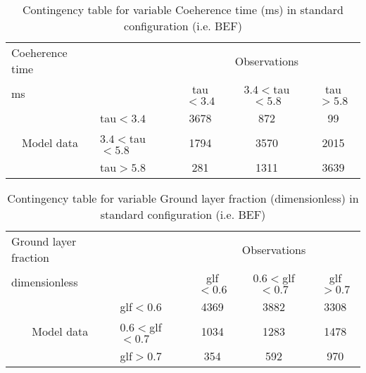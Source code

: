 \documentclass[11pt,english]{article}
\begin{document}
\begin{table}[]
\begin{center}
\begin{tabular}{llccc}
\hline
{Coeherence time}                                       &                                                    & \multicolumn{3}{c}{Observations}                 \\
{ms}                                       &                             & tau$<3.4$   & $3.4<$tau$<5.8$ & tau$>5.8$ \\
\hline
\multicolumn{1}{c}{\multirow{3}{*}{Model data}}  & tau$<3.4$          & 3678                & 872                       & 99              \\
                                                 & $3.4<$tau$<5.8$ & 1794                & 3570                       & 2015              \\
                                                 & tau$>5.8$          & 281                & 1311                       & 3639              \\
\hline
\end{tabular}
\end{center}
\caption{Contingency table for variable Coeherence time (ms) in standard configuration (i.e. BEF)}
\label{tab:contingency}
\end{table}

\begin{table}[]
\begin{center}
\begin{tabular}{llccc}
\hline
{Ground layer fraction}                                       &                                                    & \multicolumn{3}{c}{Observations}                 \\
{dimensionless}                                       &                             & glf$<0.6$   & $0.6<$glf$<0.7$ & glf$>0.7$ \\
\hline
\multicolumn{1}{c}{\multirow{3}{*}{Model data}}  & glf$<0.6$          & 4369                & 3882                       & 3308              \\
                                                 & $0.6<$glf$<0.7$ & 1034                & 1283                       & 1478              \\
                                                 & glf$>0.7$          & 354                & 592                       & 970              \\
\hline
\end{tabular}
\end{center}
\caption{Contingency table for variable Ground layer fraction (dimensionless) in standard configuration (i.e. BEF)}
\label{tab:contingency}
\end{table}
\end{document}
